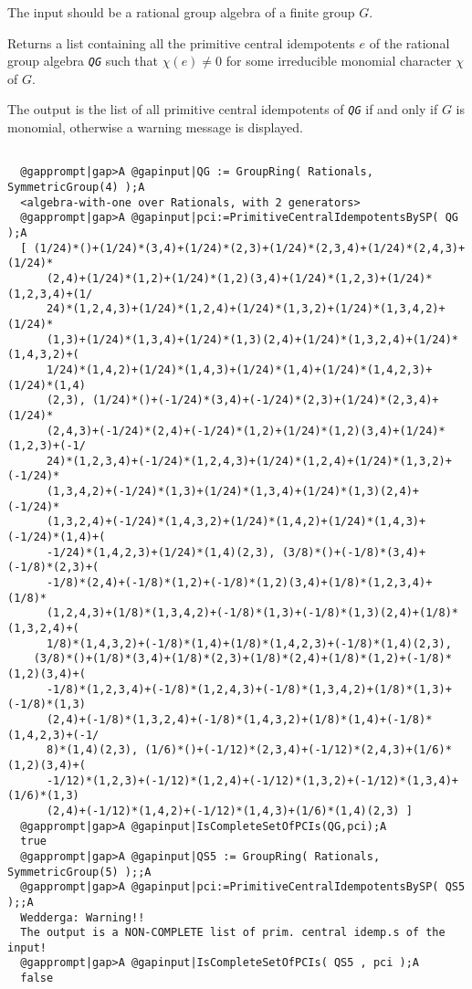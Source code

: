 \documentclass[a4paper,11pt]{report}
\begin{document}
{{{ The input should be a rational group algebra of a finite group $G$. 

 Returns a list containing all the primitive central idempotents $e$ of the rational group algebra \mbox{\texttt{\mdseries\slshape QG}} such that $\chi(e)\ne 0$ for some irreducible monomial character $\chi$ of $G$. 

 The output is the list of all primitive central idempotents of \mbox{\texttt{\mdseries\slshape QG}} if and only if $G$ is monomial, otherwise a warning message is displayed. 
\begin{Verbatim}[commandchars=@|A,fontsize=\small,frame=single,label=Example]
  
  @gapprompt|gap>A @gapinput|QG := GroupRing( Rationals, SymmetricGroup(4) );A
  <algebra-with-one over Rationals, with 2 generators>
  @gapprompt|gap>A @gapinput|pci:=PrimitiveCentralIdempotentsBySP( QG );A
  [ (1/24)*()+(1/24)*(3,4)+(1/24)*(2,3)+(1/24)*(2,3,4)+(1/24)*(2,4,3)+(1/24)*
      (2,4)+(1/24)*(1,2)+(1/24)*(1,2)(3,4)+(1/24)*(1,2,3)+(1/24)*(1,2,3,4)+(1/
      24)*(1,2,4,3)+(1/24)*(1,2,4)+(1/24)*(1,3,2)+(1/24)*(1,3,4,2)+(1/24)*
      (1,3)+(1/24)*(1,3,4)+(1/24)*(1,3)(2,4)+(1/24)*(1,3,2,4)+(1/24)*(1,4,3,2)+(
      1/24)*(1,4,2)+(1/24)*(1,4,3)+(1/24)*(1,4)+(1/24)*(1,4,2,3)+(1/24)*(1,4)
      (2,3), (1/24)*()+(-1/24)*(3,4)+(-1/24)*(2,3)+(1/24)*(2,3,4)+(1/24)*
      (2,4,3)+(-1/24)*(2,4)+(-1/24)*(1,2)+(1/24)*(1,2)(3,4)+(1/24)*(1,2,3)+(-1/
      24)*(1,2,3,4)+(-1/24)*(1,2,4,3)+(1/24)*(1,2,4)+(1/24)*(1,3,2)+(-1/24)*
      (1,3,4,2)+(-1/24)*(1,3)+(1/24)*(1,3,4)+(1/24)*(1,3)(2,4)+(-1/24)*
      (1,3,2,4)+(-1/24)*(1,4,3,2)+(1/24)*(1,4,2)+(1/24)*(1,4,3)+(-1/24)*(1,4)+(
      -1/24)*(1,4,2,3)+(1/24)*(1,4)(2,3), (3/8)*()+(-1/8)*(3,4)+(-1/8)*(2,3)+(
      -1/8)*(2,4)+(-1/8)*(1,2)+(-1/8)*(1,2)(3,4)+(1/8)*(1,2,3,4)+(1/8)*
      (1,2,4,3)+(1/8)*(1,3,4,2)+(-1/8)*(1,3)+(-1/8)*(1,3)(2,4)+(1/8)*(1,3,2,4)+(
      1/8)*(1,4,3,2)+(-1/8)*(1,4)+(1/8)*(1,4,2,3)+(-1/8)*(1,4)(2,3), 
    (3/8)*()+(1/8)*(3,4)+(1/8)*(2,3)+(1/8)*(2,4)+(1/8)*(1,2)+(-1/8)*(1,2)(3,4)+(
      -1/8)*(1,2,3,4)+(-1/8)*(1,2,4,3)+(-1/8)*(1,3,4,2)+(1/8)*(1,3)+(-1/8)*(1,3)
      (2,4)+(-1/8)*(1,3,2,4)+(-1/8)*(1,4,3,2)+(1/8)*(1,4)+(-1/8)*(1,4,2,3)+(-1/
      8)*(1,4)(2,3), (1/6)*()+(-1/12)*(2,3,4)+(-1/12)*(2,4,3)+(1/6)*(1,2)(3,4)+(
      -1/12)*(1,2,3)+(-1/12)*(1,2,4)+(-1/12)*(1,3,2)+(-1/12)*(1,3,4)+(1/6)*(1,3)
      (2,4)+(-1/12)*(1,4,2)+(-1/12)*(1,4,3)+(1/6)*(1,4)(2,3) ]
  @gapprompt|gap>A @gapinput|IsCompleteSetOfPCIs(QG,pci);A
  true
  @gapprompt|gap>A @gapinput|QS5 := GroupRing( Rationals, SymmetricGroup(5) );;A
  @gapprompt|gap>A @gapinput|pci:=PrimitiveCentralIdempotentsBySP( QS5 );;A
  Wedderga: Warning!!
  The output is a NON-COMPLETE list of prim. central idemp.s of the input!
  @gapprompt|gap>A @gapinput|IsCompleteSetOfPCIs( QS5 , pci );A
  false
  

\end{Verbatim}}}}
\end{document}
